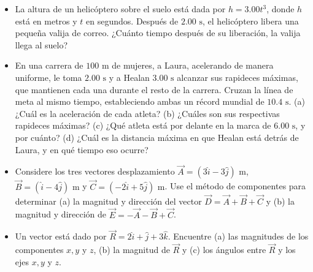 \documentclass[11pt,a4paper]{article}
\begin{document}
\begin{itemize}
    \item[\textbf{5.}] La altura de un helicóptero sobre el suelo está dada por $h = 3.00t^3$, donde $h$ está en metros y $t$ en segundos. Después de $2.00 \text{ s}$, el helicóptero libera una pequeña valija de correo. ¿Cuánto tiempo después de su liberación, la valija llega al suelo?
    \vspace*{6cm}

    \item[\textbf{6.}] En una carrera de $100 \text{ m}$ de mujeres, a Laura, acelerando de manera uniforme, le toma $2.00 \text{ s}$ y a Healan $3.00 \text{ s}$ alcanzar sus rapideces máximas, que mantienen cada una durante el resto de la carrera. Cruzan la línea de meta al mismo tiempo, estableciendo ambas un récord mundial de $10.4 \text{ s}$. (a) ¿Cuál es la aceleración de cada atleta? (b) ¿Cuáles son sus respectivas rapideces máximas? (c) ¿Qué atleta está por delante en la marca de $6.00 \text{ s}$, y por cuánto? (d) ¿Cuál es la distancia máxima en que Healan está detrás de Laura, y en qué tiempo eso ocurre?
    \vspace*{8cm}

    \item[\textbf{7.}] Considere los tres vectores desplazamiento $\vec{A} = (3\hat{i} - 3\hat{j}) \text{ m}$, $\vec{B} = (\hat{i} - 4\hat{j}) \text{ m}$ y $\vec{C} = (-2\hat{i} + 5\hat{j}) \text{ m}$. Use el método de componentes para determinar (a) la magnitud y dirección del vector $\vec{D} = \vec{A} + \vec{B} + \vec{C}$ y (b) la magnitud y dirección de $\vec{E} = -\vec{A} - \vec{B} + \vec{C}$.
    \vspace*{6cm}

    \item[\textbf{8.}] Un vector está dado por $\vec{R} = 2\hat{i} + \hat{j} + 3\hat{k}$. Encuentre (a) las magnitudes de los componentes $x, y$ y $z$, (b) la magnitud de $\vec{R}$ y (c) los ángulos entre $\vec{R}$ y los ejes $x, y$ y $z$.
    \vspace*{6cm}
\end{itemize}
\end{document}
